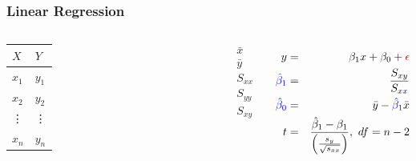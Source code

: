 \begin{frame}
  \frametitle{Linear Regression}

    \begin{columns}

      \begin{tabular}{l|l}
        $X$    & $Y$ \\ \hline
        $x_1$  & $y_1$  \\
        $x_2$  & $y_2$  \\
        \vdots & \vdots  \\
        $x_n$  & $y_n$
      \end{tabular}


      \begin{eqnarray*}
        \bar{x} \\
        \bar{y} \\
        S_{xx} \\
        S_{yy} \\
        S_{xy} 
        \end{eqnarray*}

      
      \begin{eqnarray*}
        y & = & \beta_1 x + \beta_0 + {\color{red}\epsilon} \\
        {\color{blue}\hat{\beta}_1} & = & \frac{S_{xy}}{S_{xx}} \\
        {\color{blue}\hat{\beta}_0} & = & \bar{y} - {\color{blue}\hat{\beta}_1} \bar{x} \\
        t & = & \frac{\hat{\beta}_1-\beta_1}{\left(\frac{s_y}{\sqrt{s_{xx}}}\right)},~df=n-2
      \end{eqnarray*}

    \end{columns}





\end{frame}


